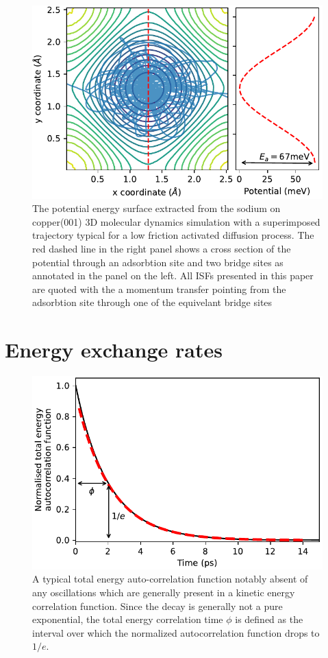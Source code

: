 \documentclass[7pt]{article}
\begin{document}
\begin{figure}
	\centering
	\includegraphics[width=1.0\columnwidth]{pot_surface}
	\caption{The potential energy surface extracted from the sodium on copper(001) 3D molecular dynamics simulation with a superimposed trajectory typical for a low friction activated diffusion process. The red dashed line in the right panel shows a cross section of the potential through an adsorbtion site and two bridge sites as annotated in the panel on the left. All ISFs presented in this paper are quoted with the a momentum transfer pointing from the adsorbtion site through one of the equivelant bridge sites}
	\label{fig:pot_surface}
\end{figure}

\section*{Energy exchange rates}

\begin{figure}
	\centering
	\includegraphics[width=1.0\columnwidth]{e_auto}
	\caption{A typical total energy auto-correlation function notably absent of any oscillations which are generally present in a kinetic energy correlation function. Since the decay is generally not a pure exponential, the total energy correlation time $\phi$ is defined as the interval over which the normalized autocorrelation function drops to $1/e$.}
	\label{fig:e_auto}
\end{figure}
\end{document}
